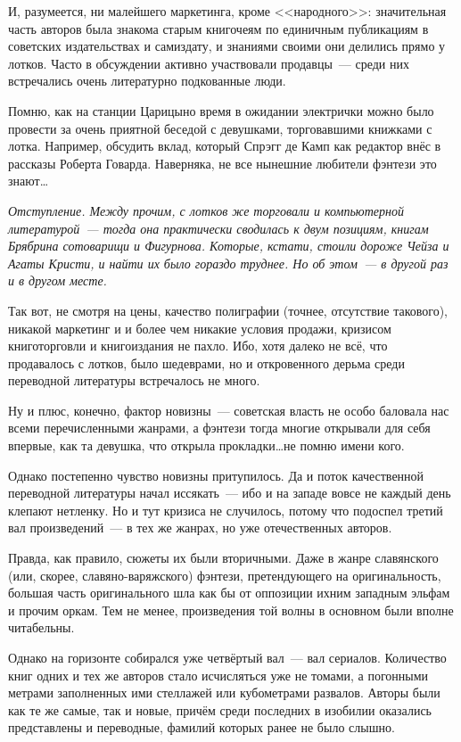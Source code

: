 И, разумеется, ни малейшего маркетинга, кроме <<народного>>: значительная часть авторов была знакома старым книгочеям по единичным публикациям в советских издательствах и самиздату, и знаниями своими они делились прямо у лотков. Часто в обсуждении активно участвовали продавцы~--- среди них встречались очень литературно подкованные люди.

Помню, как на станции Царицыно время в ожидании электрички можно было провести за очень приятной беседой с девушками, торговавшими книжками с лотка. Например, обсудить вклад, который Спрэгг де Камп как редактор внёс в рассказы Роберта Говарда. Наверняка, не все нынешние любители фэнтези это знают\dots


\textit{Отступление. Между прочим, с лотков же торговали и компьютерной литературой~--- тогда она практически сводилась к двум позициям, книгам Брябрина сотоварищи и Фигурнова. Которые, кстати, стоили дороже Чейза и Агаты Кристи, и найти их было гораздо труднее. Но об этом~--- в другой раз и в другом месте.}


Так вот, не смотря на цены, качество полиграфии (точнее, отсутствие такового), никакой маркетинг и и более чем никакие условия продажи, кризисом книготорговли и книгоиздания не пахло. Ибо, хотя далеко не всё, что продавалось с лотков, было шедеврами, но и откровенного дерьма среди переводной литературы встречалось не много.

Ну и плюс, конечно, фактор новизны~--- советская власть не особо баловала нас всеми перечисленными жанрами, а фэнтези тогда многие открывали для себя впервые, как та девушка, что открыла прокладки\dots не помню имени кого.

Однако постепенно чувство новизны притупилось. Да и поток качественной переводной литературы начал иссякать~--- ибо и на западе вовсе не каждый день клепают нетленку. Но и тут кризиса не случилось, потому что подоспел третий вал произведений~--- в тех же жанрах, но уже отечественных авторов.

Правда, как правило, сюжеты их были вторичными. Даже в жанре славянского (или, скорее, славяно-варяжского) фэнтези, претендующего на оригинальность, большая часть оригинального шла как бы от оппозиции ихним западным эльфам и прочим оркам. Тем не менее, произведения той волны в основном были вполне читабельны.

Однако на горизонте собирался уже четвёртый вал~--- вал сериалов. Количество книг одних и тех же авторов стало исчисляться уже не томами, а погонными метрами заполненных ими стеллажей или кубометрами развалов. Авторы были как те же самые, так и новые, причём среди последних в изобилии оказались представлены и переводные, фамилий которых ранее не было слышно.


